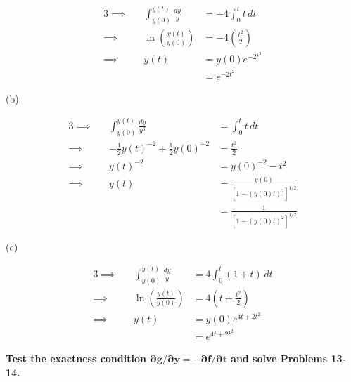 \documentclass[a4paper]{article}
\begin{document}
\begin{alignat*}{3}
	\implies && \int^{y \!\left( t \right) }_{y \!\left( 0 \right) } \frac{dy}{y}  & = -4 \int^{t}_{0} t \, dt  \\
	\implies && \ln\left( \frac{y \!\left( t \right) }{y \!\left( 0 \right) } \right) & = -4 \!\left( \frac{t^{2}}{2} \right)  \\ 
	\implies && y \!\left( t \right)  & = y \!\left( 0 \right) e^{-2t^{2}} \\
		 && & = e^{-2t^{2}}
\end{alignat*}

(b) 

\begin{alignat*}{3}
	\implies && \int^{y \!\left( t \right) }_{y \!\left( 0 \right) } \frac{dy}{y^{3}}  & = \int^{t}_{0} t \, dt  \\
	\implies && -\frac{1}{2} y \!\left( t \right)^{-2} + \frac{1}{2} y \!\left( 0 \right)^{-2} & = \frac{t^{2}}{2} \\ 
	\implies && y \!\left( t \right)^{-2} & = y \!\left( 0 \right)^{-2} - t^{2} \\
	\implies && y \!\left( t \right) & = \frac{y \!\left( 0 \right)}{\left[ 1 - \!\left( y \!\left( 0 \right)t \right)^{2} \right]^{1/2}} \\
		 && & = \frac{1}{\left[ 1 - \!\left( y \!\left( 0 \right) t \right)^{2} \right]^{1/2} }
\end{alignat*}

(c)

\begin{alignat*}{3}
	\implies && \int^{y \!\left( t \right) }_{y \!\left( 0 \right) } \frac{dy}{y}  & = 4 \int^{t}_{0} \!\left( 1 + t \right)  \, dt  \\
	\implies && \ln\left( \frac{y \!\left( t \right) }{y \!\left( 0 \right) } \right) & = 4\!\left( t + \frac{t^{2}}{2} \right)  \\ 
	\implies && y \!\left( t \right) & = y \!\left( 0 \right) e^{4t + 2t^{2}} \\
		 && & = e^{4t + 2t^{2}}
\end{alignat*}

\newpage

\textbf{Test the exactness condition \(\bm{\partial g / \partial y = -\partial f / \partial t}\) and solve Problems 13-14.}

\vspace{12pt}

\end{document}
